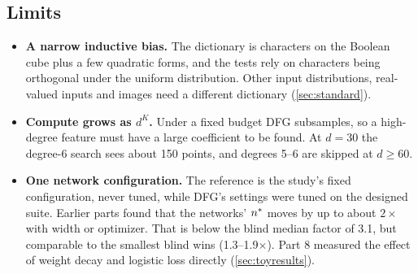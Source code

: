 \subsection{Limits}\label{sec:dfglimits}

\begin{itemize}
\item \textbf{A narrow inductive bias.} The dictionary is characters on the Boolean cube plus a few quadratic forms, and the tests rely on characters being orthogonal under the uniform distribution. Other input distributions, real-valued inputs and images need a different dictionary (\cref{sec:standard}).
\item \textbf{Compute grows as $d^K$.} Under a fixed budget DFG subsamples, so a high-degree feature must have a large coefficient to be found. At $d=30$ the degree-6 search sees about 150 points, and degrees 5--6 are skipped at $d\ge60$.
\item \textbf{One network configuration.} The reference is the study's fixed configuration, never tuned, while DFG's settings were tuned on the designed suite. Earlier parts found that the networks' $n^{*}$ moves by up to about $2\times$ with width or optimizer. That is below the blind median factor of 3.1, but comparable to the smallest blind wins (1.3--1.9$\times$). Part 8 measured the effect of weight decay and logistic loss directly (\cref{sec:toyresults}).
\end{itemize}
